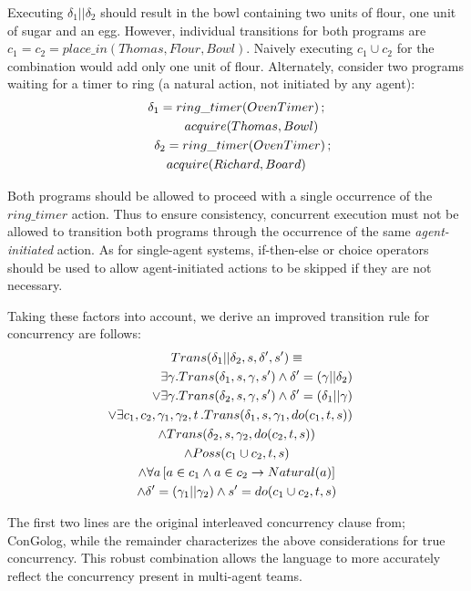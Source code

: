\documentclass{llncs}
\begin{document}
Executing $\delta_{1}||\delta_{2}$ should result in the bowl containing
two units of flour, one unit of sugar and an egg. However, individual
transitions for both programs are $c_{1}=c_{2}=place\_ in(Thomas,Flour,Bowl)$.
Naively executing $c_1 \cup c_2$ for the combination would add only one unit
of flour. Alternately, consider two programs
waiting for a timer to ring (a natural action, not initiated by any agent):
\begin{multline}
\delta_{1}=ring\_ timer(OvenTimer)\,;\\
   \shoveright{acquire(Thomas,Bowl)}\\
\shoveleft{\delta_{2}=ring\_ timer(OvenTimer)\,;}\\
    acquire(Richard,Board)
\end{multline}

Both programs should be allowed to proceed with a single occurrence
of the $ring\_ timer$ action. Thus to ensure consistency, 
concurrent execution must not be allowed
to transition both programs through the occurrence of the same
\emph{agent-initiated} action.  As for single-agent systems, if-then-else or
choice operators should be used to allow agent-initiated actions to be
skipped if they are not necessary.

Taking these factors into account, we derive an improved transition
rule for concurrency are follows:
\begin{multline}
\label{eqn:trans_conc_new}
Trans(\delta_{1}||\delta_{2},s,\delta',s')\equiv\\
\shoveright{\exists\gamma. Trans(\delta_{1},s,\gamma,s')\wedge \delta'=(\gamma||\delta_2)}\\
\shoveright{\vee\exists\gamma. Trans(\delta_{2},s,\gamma,s')\wedge \delta'=(\delta_1 || \gamma)}\\
\shoveright{\vee\exists c_{1},c_{2},\gamma_{1},\gamma_{2},t\,.Trans(\delta_{1},s,\gamma_{1},do(c_{1},t,s))}\\
\wedge Trans(\delta_{2},s,\gamma_{2},do(c_{2},t,s))\\
\wedge Poss(c_{1}\cup c_{2},t,s)\\
\wedge\forall a\left[a\in c_{1}\wedge a\in c_{2}\rightarrow Natural(a)\right]\\
\wedge\delta'=(\gamma_{1}||\gamma_{2})\wedge s'=do(c_{1}\cup c_{2},t,s)
\end{multline}

The first two lines are the original interleaved concurrency clause from;
ConGolog, while the remainder
characterizes the above considerations for true concurrency.
This robust combination allows
the language to more accurately reflect the concurrency present in
multi-agent teams.
\end{document}
